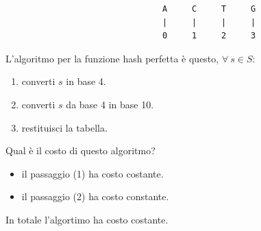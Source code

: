     \begin{verbatim}
                                A     C     T     G      
                                |     |     |     |
                                0     1     2     3
\end{verbatim}
L'algoritmo per la funzione hash perfetta è questo, $\forall \ s \in S$:
\begin{enumerate}
    \item converti $s$ in base 4.
    \item converti $s$ da base 4 in base 10.
    \item restituisci la tabella.
\end{enumerate}

\noindent Qual è il costo di questo algoritmo?
\begin{itemize}
    \item il passaggio (1) ha costo costante.
    \item il passaggio (2) ha costo constante.
\end{itemize}
In totale l'algortimo ha costo costante.



\newpage


